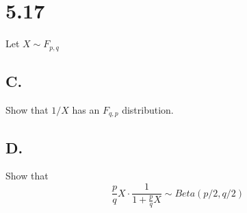 \section*{5.17}

Let $X \sim F_{p,q}$





\subsection*{C.}

Show that $1/X$ has an $F_{q,p}$ distribution.

\subsection*{D.}

Show that 
\[\frac{p}{q}X \cdot \frac{1}{1+\frac{p}{q}X} \sim Beta(p/2, q/2)\]
